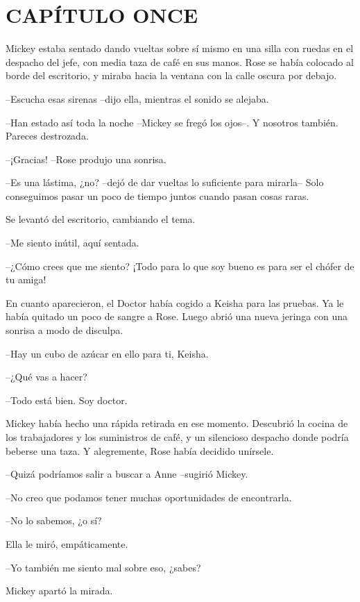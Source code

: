 \chapter*{CAPÍTULO ONCE}

{Mickey estaba sentado dando vueltas sobre sí mismo en una silla con
 ruedas en el despacho del jefe, con media taza de café en sus manos.
 Rose se había colocado al borde del escritorio, y miraba hacia la
ventana con la calle oscura por debajo.}

{--Escucha esas sirenas --dijo ella, mientras el sonido se alejaba.}

{--Han estado así toda la noche --Mickey se fregó los ojos--. Y nosotros
también. Pareces destrozada.}

{--¡Gracias! --Rose produjo una sonrisa.}

{--Es una lástima, ¿no? --dejó de dar vueltas lo suficiente para
 mirarla-- Solo conseguimos pasar un poco de tiempo juntos cuando pasan
cosas raras.}

{Se levantó del escritorio, cambiando el tema.}

{--Me siento inútil, aquí sentada.}

{--¿Cómo crees que me siento? ¡Todo para lo que soy bueno es para ser el
chófer de tu amiga!}

{En cuanto aparecieron, el Doctor había cogido a Keisha para las
 pruebas. Ya le había quitado un poco de sangre a Rose. Luego abrió una
nueva jeringa con una sonrisa a modo de disculpa.}

{--Hay un cubo de azúcar en ello para ti, Keisha.}

{--¿Qué vas a hacer?}

{--Todo está bien. Soy doctor.}

{Mickey había hecho una rápida retirada en ese momento. Descubrió la
 cocina de los trabajadores y los suministros de café, y un silencioso
 despacho donde podría beberse una taza. Y alegremente, Rose había
decidido unírsele.}

{--Quizá podríamos salir a buscar a Anne --sugirió Mickey.}

{--No creo que podamos tener muchas oportunidades de encontrarla.}

{--No lo sabemos, ¿o sí?}

{Ella le miró, empáticamente.}

{--Yo también me siento mal sobre eso, ¿sabes?}

{Mickey apartó la mirada.}

